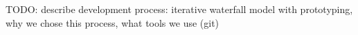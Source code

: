 TODO: describe development process: iterative waterfall model with prototyping, why we chose this process, what tools we use (git) 

